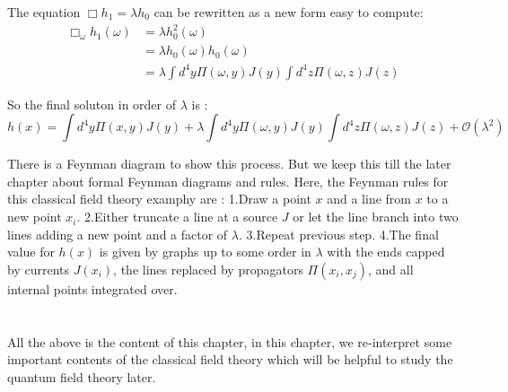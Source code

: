 \documentclass[12pt,openany]{book}
\begin{document}
	The equation $\Box h_1=\lambda h_0$ can be rewritten as a new form easy to compute:
	\begin{equation}
		\begin{aligned}
			\Box_\omega h_1(\omega)&=\lambda h_0^2(\omega)\\
			&=\lambda h_0(\omega)h_0(\omega)\\
			&=\lambda \int d^4y \Pi(\omega,y)J(y)\int d^4z \Pi(\omega,z)J(z)
		\end{aligned}
	\end{equation}\par 
	So the final soluton in order of $\lambda$ is :
	\begin{equation}\label{integral solution to lambda 2 order}
		h(x)=\int d^4y \Pi(x,y)J(y)+\lambda \int d^4y \Pi(\omega,y)J(y)\int d^4z \Pi(\omega,z)J(z)+\mathcal{O}(\lambda^2)
	\end{equation}\par 
	There is a Feynman diagram to show this process. But we keep this till the later chapter about formal Feynman diagrams and rules. Here, the 
	Feynman rules for this classical field theory examphy are : 
	1.Draw a point $x$ and a line from $x$ to a new point $x_i$. 
	2.Either truncate a line at a source $J$ or let the line branch into two lines adding a new point and a factor of $\lambda$.
	3.Repeat previous step.
	4.The final value for $h(x)$ is given by graphs up to some order in $\lambda$ with the ends capped by currents $J(x_i)$, the lines replaced by propagators $\Pi(x_i,x_j)$, and all internal points integrated over.
	\\
	\\
	\\
	All the above is the content of this chapter, in this chapter, we re-interpret some important contents of the classical field theory which will be helpful to study the quantum field theory later.
	
	
	
	
	
	
	
	
	
	
	
	
	
	
	
	
	
	
	
	
	
	
	
	
	
	
	
	
	
	
	
\end{document}

